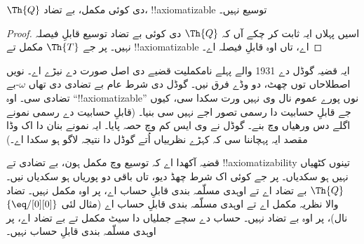 \documentclass[../../../include/open-logic-section]{subfiles}
\begin{document}


\begin{thm}
$\Th{Q}$ دی کوئی مکمل، بے تضاد، !!{axiomatizable} توسیع نہیں۔
\end{thm}

\begin{proof}
اسیں پہلاں ایہ ثابت کر چکے آں کہ $\Th{Q}$ دی کوئی بے تضاد
توسیع قابلِ فیصلہ نہیں۔ پر جے $\Th{T}$ مکمل تے !!{axiomatizable}
اے، تاں اوہ قابلِ فیصلہ اے۔
\end{proof}

\begin{explain}
ایہ قضیہ گوڈل دے 1931 والے پہلے نامکملیت قضیے دی اصل صورت
دے نیڑے اے۔ نویں اصطلاحاں توں چھٹ، دو وڈے فرق نیں۔ گوڈل دی
شرط عام بے تضادی دی تھاں $\omega$-بے تضادی سی۔ اوہ “!!{axiomatizable}”
نوں پورے عموم نال وی نہیں ورت سکدا سی، کیوں جے قابلِ حسابیت دا
رسمی تصور اجے نہیں سی بنیا۔ (قابلِ حسابیت دے رسمی نمونے اگلے
دس ورھیاں وچ بنے۔ گوڈل نے وی ایس کم وچ حصہ پایا۔ ایہ نمونے
بنان دا اک وڈا مقصد ایہ پہچاننا سی کہ کہڑے نظرییاں اُتے گوڈل
دا نتیجہ لاگو ہو سکدا اے۔)

قضیہ آکھدا اے کہ توسیع وچ مکمل ہون، بے تضادی تے !!{axiomatizability}
تینوں کٹھیاں نہیں ہو سکدیاں۔ پر جے کوئی اک شرط چھڈ دیو، تاں
باقی دو پوریاں ہو سکدیاں نیں۔ $\Th{Q}$ بے تضاد اے تے اوہدی
مسلّمہ بندی قابلِ حساب اے، پر اوہ مکمل نہیں۔ تضاد والا نظریہ
مکمل اے تے اوہدی مسلّمہ بندی قابلِ حساب اے (مثال لئی
$\{ \eq/[0][0] \}$ نال)، پر اوہ بے تضاد نہیں۔ حساب دے سچے
جملیاں دا سیٹ مکمل تے بے تضاد اے، پر اوہدی مسلّمہ بندی قابلِ
حساب نہیں۔
\end{explain}
\end{document}
